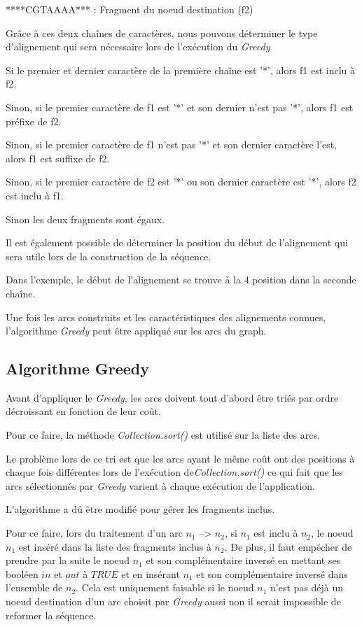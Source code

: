 \documentclass[12pt,a4paper,final]{article}
\begin{document}
****CGTAAAA*** : Fragment du noeud destination (f2) \medskip


Grâce à ces deux chaînes de caractères, nous pouvons déterminer le type d'alignement qui sera nécessaire lors de l'exécution du \textit{Greedy}\medskip

Si le premier et dernier caractère de la première chaîne est '*', alors f1 est inclu à f2.\medskip

Sinon, si le premier caractère de f1 est '*' et son dernier n'est pas '*', alors f1 est préfixe de f2.\medskip

Sinon, si le premier caractère de f1 n'est pas '*' et son dernier caractère l'est, alors f1 est suffixe de f2.\medskip

Sinon,  si le premier caractère de f2 est '*' ou son dernier caractère est '*', alors f2 est inclu à f1.\medskip

Sinon les deux fragments sont égaux.\medskip

Il est également possible de déterminer la position du début de l'alignement qui sera utile lors de la construction de la séquence.\medskip

Dans l'exemple, le début de l'alignement se trouve à la 4 position dans la seconde chaîne.\medskip

Une fois les arcs construits et les caractéristiques des alignements connues, l'algorithme \textit{Greedy} peut être appliqué sur les arcs du graph.\medskip

\subsection{Algorithme Greedy}

Avant d'appliquer le \textit{Greedy}, les arcs doivent tout d'abord être triés par ordre décroissant en fonction de leur coût.\medskip

Pour ce faire, la méthode \textit{Collection.sort()} est utilisé sur la liste des arcs.\medskip

Le problème lors de ce tri est que les arcs ayant le même coût ont des positions à chaque fois différentes lors de l'exécution de\textit{Collection.sort()} ce qui fait que les arcs sélectionnés par \textit{Greedy} varient à chaque exécution de l'application.\medskip

L'algorithme a dû être modifié pour gérer les fragments inclus.\medskip

Pour ce faire, lors du traitement d'un arc $n_1$ --> $n_2$, si $n_1$ est inclu à $n_2$, le noeud $n_1$ est inséré dans la liste des fragments inclus à $n_2$.  De plus, il faut empécher de prendre par la suite le noeud $n_1$ et son complémentaire inversé en mettant ses booléen $in$ et $out$ à $TRUE$ et en insérant $n_1$ et son complémentaire inversé dans l'ensemble de $n_2$.  Cela est uniquement faisable si le noeud $n_1$ n'est pas déjà un noeud destination d'un arc choisit par \textit{Greedy} aussi non il serait impossible de reformer la séquence. \medskip
\end{document}
